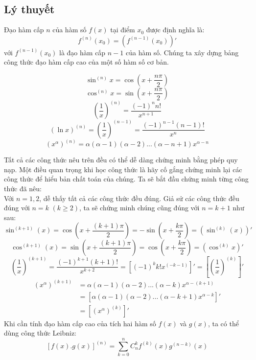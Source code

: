 \subsection{Lý thuyết}
Đạo hàm cấp $n$ của hàm số $f(x)$ tại điểm $x_{0}$ được định nghĩa là:
$$f^{(n)}(x_{0})=(f^{(n-1)}(x_{0}))'$$
với $f^{(n-1)}(x_{0})$ là đạo hàm cấp $n-1$ của hàm số.
Chúng ta xây dựng bảng công thức đạo hàm cấp cao của một số hàm số cơ bản.
\begin{tcolorbox}
\begin{equation}
\sin^{(n)}{x}=\cos{\left(x+\frac{n\pi}{2}\right)}
\end{equation}
\begin{equation}
\cos^{(n)}{x}=\sin{\left(x+\frac{n\pi}{2}\right)}
\end{equation}
\begin{equation}
\left(\frac{1}{x}\right)^{(n)}=\frac{(-1)^{n}n!}{x^{n+1}}
\end{equation}
\begin{equation}
(\ln{x})^{(n)}=\left(\frac{1}{x}\right)^{(n-1)}=\frac{(-1)^{n-1}(n-1)!}{x^n}
\end{equation}
\begin{equation}
(x^\alpha)^{(n)}=\alpha(\alpha-1)(\alpha-2)...(\alpha-n+1)x^{\alpha-n}
\end{equation}
\end{tcolorbox}
Tất cả các công thức nêu trên đều có thể dễ dàng chứng minh bằng phép quy nạp. Một điều quan trọng khi học công thức là hãy cố gắng chứng minh lại các công thức để hiểu bản chất toán của chúng.
Ta sẽ bắt đầu chứng minh từng công thức đã nêu:
\\Với $n=1,2$, dễ thấy tất cả các công thức đều đúng. Giả sử các công thức đều đúng với $n=k$ $(k\geq2)$, ta sẽ chứng minh chúng cũng đúng với $n=k+1$ như sau:
$$\sin^{(k+1)}(x)=\cos\left(x+\frac{(k+1)\pi}{2}\right)=-\sin\left(x+\frac{k\pi}{2}\right)=(\sin^{(k)}(x))'$$
$$\cos^{(k+1)}(x)=\sin\left(x+\frac{(k+1)\pi}{2}\right)=\cos{\left(x+\frac{k\pi}{2}\right)}=(\cos^{(k)}{x})'$$
$$\left(\frac{1}{x}\right)^{(k+1)}=\frac{(-1)^{k+1}(k+1)!}{x^{k+2}}=[(-1)^{k}k!x^{(-k-1)}]'=\left[\left(\frac{1}{x}\right)^{(k)}\right]'$$
\begin{equation*}
\begin{split}
(x^\alpha)^{(k+1)}&=\alpha(\alpha-1)(\alpha-2)...(\alpha-k)x^{\alpha-(k+1)}\\&=[\alpha(\alpha-1)(\alpha-2)...(\alpha-k+1)x^{\alpha-k}]'\\&=[(x^{\alpha})^{(k)}]'
\end{split}
\end{equation*}
Khi cần tính đạo hàm cấp cao của tích hai hàm số $f(x)$ và $g(x)$, ta có thể dùng công thức Leibniz: \begin{equation}\label{eq:ninth}
    [f(x).g(x)]^{(n)}=\sum_{k=0}^{n}C_{n}^{k}f^{(k)}(x)g^{(n-k)}(x)
\end{equation}
